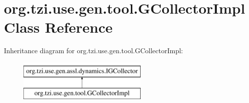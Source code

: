 \hypertarget{classorg_1_1tzi_1_1use_1_1gen_1_1tool_1_1_g_collector_impl}{\section{org.\-tzi.\-use.\-gen.\-tool.\-G\-Collector\-Impl Class Reference}
\label{classorg_1_1tzi_1_1use_1_1gen_1_1tool_1_1_g_collector_impl}
}
Inheritance diagram for org.\-tzi.\-use.\-gen.\-tool.\-G\-Collector\-Impl\-:\begin{figure}[H]
\begin{center}
\leavevmode
\includegraphics[height=2.000000cm]{classorg_1_1tzi_1_1use_1_1gen_1_1tool_1_1_g_collector_impl}
\end{center}
\end{figure}
